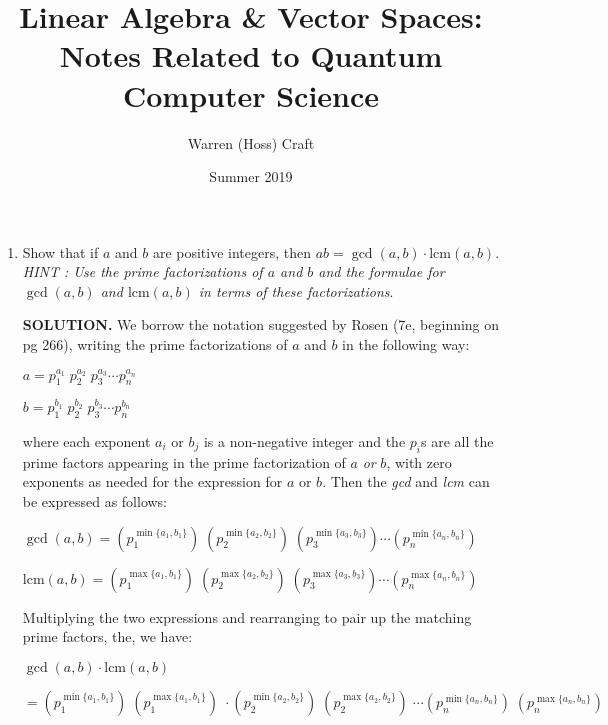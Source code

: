 \documentclass{article}
\title{Linear Algebra \& Vector Spaces:\\Notes Related to Quantum Computer Science}
\author{Warren (Hoss) Craft}
\date{Summer 2019}
\begin{document}
\maketitle

\flushleft

\begin{enumerate}


\item Show that if $a$ and $b$ are positive integers, then $ab = \gcd(a,b)\cdot \text{lcm}(a,b)$. \textit{HINT : Use the prime factorizations of $a$ and $b$ and the formulae for $\gcd(a, b)$ and $\text{lcm} (a, b)$ in terms of these factorizations}.\par

\vspace{0.1 in}

\textbf{SOLUTION.} We borrow the notation suggested by Rosen (7e, beginning on pg 266), writing the prime factorizations of $a$ and $b$ in the following way:\par

\begin{adjustwidth}{0.5 in}{0.5 in}
$a = p_1^{a_1}\; p_2^{a_2}\; p_3^{a_3}\cdots p_n^{a_n}$\par
$b = p_1^{b_1}\; p_2^{b_2}\; p_3^{b_3}\cdots p_n^{b_n}$\par
\end{adjustwidth}

where each exponent $a_i$ or $b_j$ is a non-negative integer and the $p_i$s are all the prime factors appearing in the prime factorization of $a$ \textit{or} $b$, with zero exponents as needed for the expression for $a$ or $b$. Then the \textit{gcd} and \textit{lcm} can be expressed as follows:\par
\begin{adjustwidth}{0.5 in}{0.5 in}
$\gcd(a, b) = (p_1^{\min\{a_1, b_1\}})\;
              (p_2^{\min\{a_2, b_2\}})\;
              (p_3^{\min\{a_3, b_3\}}) \cdots
              (p_n^{\min\{a_n, b_n\}})$\par
lcm$(a,b)   = (p_1^{\max\{a_1, b_1\}})\;
              (p_2^{\max\{a_2, b_2\}})\;
              (p_3^{\max\{a_3, b_3\}}) \cdots
              (p_n^{\max\{a_n, b_n\}})$\par
\end{adjustwidth}
Multiplying the two expressions and rearranging to pair up the matching prime factors, the, we have:\par
\begin{adjustwidth}{0.5 in}{0.5 in}
$\gcd(a, b)\cdot\text{lcm}(a,b)$\par
  $= (p_1^{\min\{a_1, b_1\}})\;
     (p_1^{\max\{a_1, b_1\}})\;\cdot
     (p_2^{\min\{a_2, b_2\}})\;
     (p_2^{\max\{a_2, b_2\}})\;\cdots
     (p_n^{\min\{a_n, b_n\}})\;
     (p_n^{\max\{a_n, b_n\}})$\par
     

\end{adjustwidth}
\end{enumerate}
\end{document}
